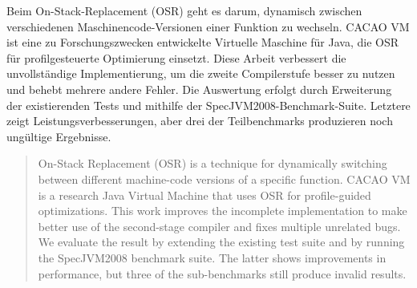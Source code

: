 \documentclass[draft,final]{vutinfth} %
\begin{document}
    \frontmatter %

    \addstatementpage



    \begin{kurzfassung}
        Beim On-Stack-Replacement (OSR) geht es darum, dynamisch zwischen verschiedenen Maschinencode-Versionen einer Funktion zu wechseln.
        CACAO VM ist eine zu Forschungszwecken entwickelte Virtuelle Maschine für Java,
        die OSR für profilgesteuerte Optimierung einsetzt.
        Diese Arbeit verbessert die unvollständige Implementierung,
        um die zweite Compilerstufe besser zu nutzen
        und behebt mehrere andere Fehler.
        Die Auswertung erfolgt durch Erweiterung der existierenden Tests
        und mithilfe der SpecJVM2008-Benchmark-Suite.
        Letztere zeigt Leistungsverbesserungen,
        aber drei der Teilbenchmarks produzieren noch ungültige Ergebnisse.
    \end{kurzfassung}

    \begin{abstract}
        On-Stack Replacement (OSR) is a technique for dynamically switching between different machine-code versions of a specific function.
        CACAO VM is a research Java Virtual Machine that uses OSR for profile-guided optimizations.
        This work improves the incomplete implementation
        to make better use of the second-stage compiler
        and fixes multiple unrelated bugs.
        We evaluate the result by extending the existing test suite
        and by running the SpecJVM2008 benchmark suite.
        The latter shows improvements in performance,
        but three of the sub-benchmarks still produce invalid results.
    \end{abstract}


    \tableofcontents %
\end{document}
